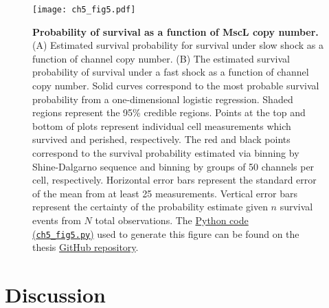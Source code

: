 \documentclass[12pt]{caltech_thesis}
\begin{document}
\hypertarget{fig:survival}{%
\begin{figure}
\centering
\texttt{[image: ch5\_fig5.pdf]}
\caption[{Probability of survival as a function of MscL copy
number.}]{\textbf{Probability of survival as a function of MscL copy
number.} (A) Estimated survival probability for survival under slow
shock as a function of channel copy number. (B) The estimated survival
probability of survival under a fast shock as a function of channel copy
number. Solid curves correspond to the most probable survival
probability from a one-dimensional logistic regression. Shaded regions
represent the 95\% credible regions. Points at the top and bottom of
plots represent individual cell measurements which survived and
perished, respectively. The red and black points correspond to the
survival probability estimated via binning by Shine-Dalgarno sequence
and binning by groups of 50 channels per cell, respectively. Horizontal
error bars represent the standard error of the mean from at least 25
measurements. Vertical error bars represent the certainty of the
probability estimate given \(n\) survival events from \(N\) total
observations. The
\href{https://github.com/gchure/phd/blob/master/src/chapter_05/code/ch5_fig5.py}{Python
code\\
(\texttt{ch5\_fig5.py})} used to generate this figure can be found on
the thesis \href{https://github.com/gchure/phd}{GitHub repository}.}
\label{fig:survival}
\end{figure}
}

\hypertarget{discussion-3}{%
\section{Discussion}\label{discussion-3}}
\end{document}
